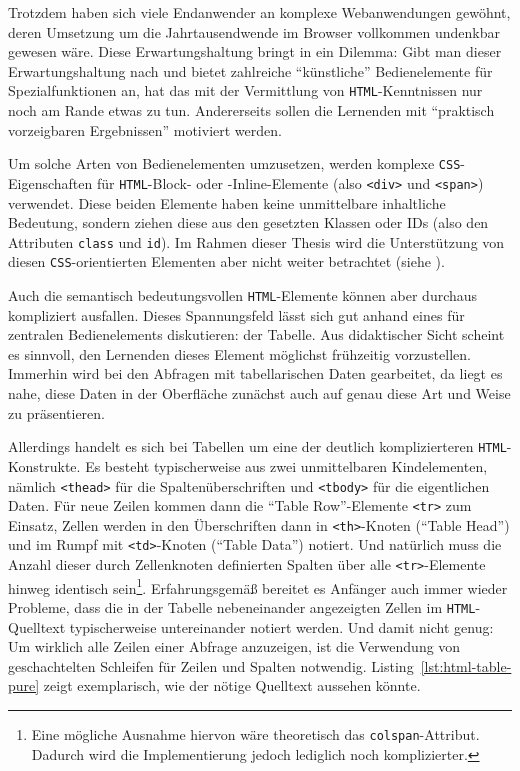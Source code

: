 Trotzdem haben sich viele Endanwender an komplexe Webanwendungen gewöhnt, deren Umsetzung um die Jahrtausendwende im Browser vollkommen undenkbar gewesen wäre. Diese Erwartungshaltung bringt \idename{} in ein Dilemma: Gibt man dieser Erwartungshaltung nach und bietet zahlreiche "`künstliche"' Bedienelemente für Spezialfunktionen an, hat das mit der Vermittlung von \texttt{HTML}-Kenntnissen nur noch am Rande etwas zu tun. Andererseits sollen die Lernenden mit "`praktisch vorzeigbaren Ergebnissen"' motiviert werden.

Um solche Arten von Bedienelementen umzusetzen, werden komplexe \texttt{CSS}-Eigenschaften für \texttt{HTML}-Block- oder -Inline-Elemente (also \texttt{<div>} und \texttt{<span>}) verwendet. Diese beiden Elemente haben keine unmittelbare inhaltliche Bedeutung, sondern ziehen diese aus den gesetzten Klassen oder IDs (also den Attributen \texttt{class} und \texttt{id}). Im Rahmen dieser Thesis wird die Unterstützung von diesen \texttt{CSS}-orientierten Elementen aber nicht weiter betrachtet (siehe ).

Auch die semantisch bedeutungsvollen \texttt{HTML}-Elemente können aber durchaus kompliziert ausfallen. Dieses Spannungsfeld lässt sich gut anhand eines für \idename{} zentralen Bedienelements diskutieren: der Tabelle. Aus didaktischer Sicht scheint es sinnvoll, den Lernenden dieses Element möglichst frühzeitig vorzustellen. Immerhin wird bei den Abfragen mit tabellarischen Daten gearbeitet, da liegt es nahe, diese Daten in der Oberfläche zunächst auch auf genau diese Art und Weise zu präsentieren.

Allerdings handelt es sich bei Tabellen um eine der deutlich komplizierteren \texttt{HTML}-Konstrukte. Es besteht typischerweise aus zwei unmittelbaren Kindelementen, nämlich \texttt{<thead>} für die Spaltenüberschriften und \texttt{<tbody>} für die eigentlichen Daten. Für neue Zeilen kommen dann die "`Table Row"'-Elemente \texttt{<tr>} zum Einsatz, Zellen werden in den Überschriften dann in \texttt{<th>}-Knoten ("`Table Head"') und im Rumpf mit \texttt{<td>}-Knoten ("`Table Data"') notiert. Und natürlich muss die Anzahl dieser durch Zellenknoten definierten Spalten über alle \texttt{<tr>}-Elemente hinweg identisch sein\footnote{Eine mögliche Ausnahme hiervon wäre theoretisch das \texttt{colspan}-Attribut. Dadurch wird die Implementierung jedoch lediglich noch komplizierter.}. Erfahrungsgemäß bereitet es Anfänger auch immer wieder Probleme, dass die in der Tabelle nebeneinander angezeigten Zellen im \texttt{HTML}-Quelltext typischerweise untereinander notiert werden. Und damit nicht genug: Um wirklich alle Zeilen einer Abfrage anzuzeigen, ist die Verwendung von geschachtelten Schleifen für Zeilen und Spalten notwendig. Listing~\ref{lst:html-table-pure} zeigt exemplarisch, wie der nötige Quelltext aussehen könnte.

